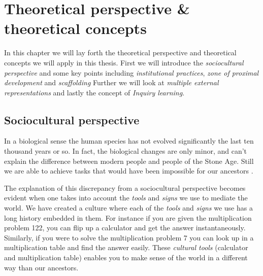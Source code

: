\chapter{Theoretical perspective \& theoretical concepts}

In this chapter we will lay forth the theoretical perspective and theoretical concepts we will apply in this thesis. First we will introduce the \emph{sociocultural perspective} and some key points including \emph{institutional practices}, \emph{zone of proximal development} and \emph{scaffolding} Further we will look at \emph{multiple external representations} and lastly the concept of \emph{Inquiry learning}.

\section{Sociocultural perspective}




In a biological sense the human species has not evolved significantly the last ten thousand years or so. In fact, the biological changes are only minor, and can’t explain the difference between modern people and people of the Stone Age. Still we are able to achieve tasks that would have been impossible for our ancestors \citep{saljo2001laering}.

The explanation of this discrepancy from a sociocultural perspective becomes evident when one takes into account the \emph{tools} and \emph{signs} we use to mediate the world. We have created a culture where each of the \emph{tools} and \emph{signs} we use has a long history embedded in them. For instance if you are given the multiplication problem 122, you can flip up a calculator and get the answer instantaneously. Similarly, if you were to solve the multiplication problem 7 you can look up in a multiplication table and find the answer easily. These \emph{cultural tools} (calculator and multiplication table) enables you to make sense of the world in a different way than our ancestors. 


